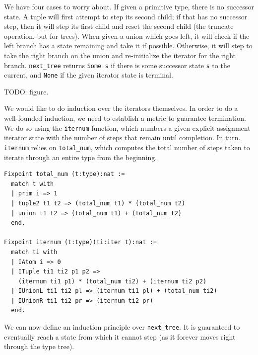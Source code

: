 \documentclass[a4paper,english]{lipics-v2019}
\begin{document}
We have four cases to worry about. If given a primitive type, there is no
successor state. A tuple will first attempt to step its second child; if  that
has no successor step, then it will step its first child and reset the second
child (the truncate operation, but for trees). When given a union which goes
left, it will check if the left branch has a state remaining and take it if
possible. Otherwise, it will step to take the right branch on the union and
re-initialize the iterator for the right branch. \verb|next_tree| returns
\verb|Some s| if there is some successor state \verb|s| to the current, and
\verb|None| if the given iterator state is terminal.

TODO: figure.

We would like to do induction over the iterators themselves. In order to do
a well-founded induction, we need to establish a metric to guarantee termination.
We do so using the \verb|iternum| function, which numbers a given explicit assignment
iterator state with the number of steps that remain until completion. In turn.
\verb|iternum| relies on \verb|total_num|, which computes the total number of
steps taken to iterate through an entire type from the beginning. 

\begin{small}\begin{verbatim}
Fixpoint total_num (t:type):nat :=
  match t with
  | prim i => 1
  | tuple2 t1 t2 => (total_num t1) * (total_num t2)
  | union t1 t2 => (total_num t1) + (total_num t2)
  end.

Fixpoint iternum (t:type)(ti:iter t):nat :=
  match ti with
  | IAtom i => 0
  | ITuple ti1 ti2 p1 p2 =>
    (iternum ti1 p1) * (total_num ti2) + (iternum ti2 p2)
  | IUnionL ti1 ti2 pl => (iternum ti1 pl) + (total_num ti2)
  | IUnionR ti1 ti2 pr => (iternum ti2 pr)
  end.
\end{verbatim}\end{small}

We can now define an induction principle over \verb|next_tree|. It is guaranteed
to eventually reach a state from which it cannot step (as it forever moves right
through the type tree). 
\end{document}
